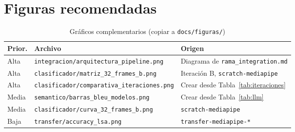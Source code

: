 \documentclass[12pt,a4paper]{report}
\begin{document}
\chapter{Figuras recomendadas}
\label{anexo:figuras}
\begin{table}[H]
\centering
\caption{Gráficos complementarios (copiar a \texttt{docs/figuras/})}
\small
\begin{tabular}{@{}llp{5.5cm}@{}}
\toprule
\textbf{Prior.} & \textbf{Archivo} & \textbf{Origen} \\
\midrule
Alta & \texttt{integracion/arquitectura\_pipeline.png} & Diagrama de \texttt{rama\_integration.md} \\
Alta & \texttt{clasificador/matriz\_32\_frames\_b.png} & Iteración B, \texttt{scratch-mediapipe} \\
Alta & \texttt{clasificador/comparativa\_iteraciones.png} & Crear desde Tabla~\ref{tab:iteraciones} \\
Media & \texttt{semantico/barras\_bleu\_modelos.png} & Crear desde Tabla~\ref{tab:llm} \\
Media & \texttt{clasificador/curva\_32\_frames\_b.png} & \texttt{scratch-mediapipe} \\
Baja & \texttt{transfer/accuracy\_lsa.png} & \texttt{transfer-mediapipe-*} \\
\bottomrule
\end{tabular}
\end{table}
\end{document}
